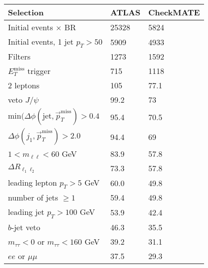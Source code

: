 \documentclass[12pt,fleqn]{article}
\begin{document}
\begin{enumerate}
\begin{table}[h!] \begin{center}
 \renewcommand*{\arraystretch}{1.2}
 \begin{tabular}{l|p{3cm}|p{3cm}} \toprule
  Selection                                                                       & ATLAS    & CheckMATE       \\ \midrule
  Initial events $\times$ BR                                                      &  25328    &  5824          \\
  Initial events, 1 jet $p_T > 50$                                                &  5909    &  4933         \\
  Filters                                                                         &  1273    &  1592  \\
  $E_T^\mathrm{miss}$ trigger                                                     &   715    &  1118 \\
  2 leptons                                                                       &   105    &  77.1 \\
  veto $J/\psi$                                                                   &  99.2    &  73 \\ 
  min$(\Delta\phi(\mathrm{jet}, \vec{p}_T^\mathrm{miss})>0.4$                     &  95.4    &  70.5 \\   
  $\Delta\phi(j_1, \vec{p}_T^\mathrm{miss})>2.0$                                  &  94.4    &  69  \\
  $1 < m_{\ell \ell} < 60$ GeV                                                    &  83.9    &  57.8  \\
  $\Delta R_{\ell_1 \ell_2}$                                                      &  73.3    &  57.8\\
  leading lepton $p_T > 5$ GeV                                                     &  60.0    &  49.8  \\
  number of jets $\geq 1$                                                         &  59.4    &  49.8  \\
  leading jet $p_T > 100 $ GeV                                                    &  53.9    &  42.4  \\ 
  $b$-jet veto                                                                    &  46.3    &  35.5  \\
  $m_{\tau\tau} < 0$ or $m_{\tau\tau} < 160$ GeV                                  &  39.2    &  31.1  \\
  $ee$ or $\mu\mu$                                                                &  37.5    &  29.3  \\

\end{tabular}
\end{center}
\end{table}
\end{enumerate}
\end{document}
